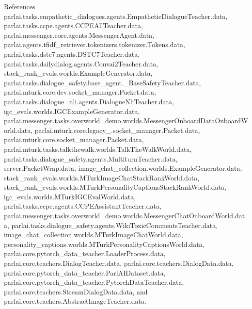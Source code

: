 References parlai.\+tasks.\+empathetic\+\_\+dialogues.\+agents.\+Empathetic\+Dialogue\+Teacher.\+data, parlai.\+tasks.\+ccpe.\+agents.\+C\+C\+P\+E\+All\+Teacher.\+data, parlai.\+messenger.\+core.\+agents.\+Messenger\+Agent.\+data, parlai.\+agents.\+tfidf\+\_\+retriever.\+tokenizers.\+tokenizer.\+Tokens.\+data, parlai.\+tasks.\+dstc7.\+agents.\+D\+S\+T\+C7\+Teacher.\+data, parlai.\+tasks.\+dailydialog.\+agents.\+Convai2\+Teacher.\+data, stack\+\_\+rank\+\_\+evals.\+worlds.\+Example\+Generator.\+data, parlai.\+tasks.\+dialogue\+\_\+safety.\+base\+\_\+agent.\+\_\+\+Base\+Safety\+Teacher.\+data, parlai.\+mturk.\+core.\+dev.\+socket\+\_\+manager.\+Packet.\+data, parlai.\+tasks.\+dialogue\+\_\+nli.\+agents.\+Dialogue\+Nli\+Teacher.\+data, igc\+\_\+evals.\+worlds.\+I\+G\+C\+Example\+Generator.\+data, parlai.\+messenger.\+tasks.\+overworld\+\_\+demo.\+worlds.\+Messenger\+Onboard\+Data\+Onboard\+World.\+data, parlai.\+mturk.\+core.\+legacy\+\_.\+socket\+\_\+manager.\+Packet.\+data, parlai.\+mturk.\+core.\+socket\+\_\+manager.\+Packet.\+data, parlai.\+mturk.\+tasks.\+talkthewalk.\+worlds.\+Talk\+The\+Walk\+World.\+data, parlai.\+tasks.\+dialogue\+\_\+safety.\+agents.\+Multiturn\+Teacher.\+data, server.\+Packet\+Wrap.\+data, image\+\_\+chat\+\_\+collection.\+worlds.\+Example\+Generator.\+data, stack\+\_\+rank\+\_\+evals.\+worlds.\+M\+Turk\+Image\+Chat\+Stack\+Rank\+World.\+data, stack\+\_\+rank\+\_\+evals.\+worlds.\+M\+Turk\+Personality\+Captions\+Stack\+Rank\+World.\+data, igc\+\_\+evals.\+worlds.\+M\+Turk\+I\+G\+C\+Eval\+World.\+data, parlai.\+tasks.\+ccpe.\+agents.\+C\+C\+P\+E\+Assistant\+Teacher.\+data, parlai.\+messenger.\+tasks.\+overworld\+\_\+demo.\+worlds.\+Messenger\+Chat\+Onboard\+World.\+data, parlai.\+tasks.\+dialogue\+\_\+safety.\+agents.\+Wiki\+Toxic\+Comments\+Teacher.\+data, image\+\_\+chat\+\_\+collection.\+worlds.\+M\+Turk\+Image\+Chat\+World.\+data, personality\+\_\+captions.\+worlds.\+M\+Turk\+Personality\+Captions\+World.\+data, parlai.\+core.\+pytorch\+\_\+data\+\_\+teacher.\+Loader\+Process.\+data, parlai.\+core.\+teachers.\+Dialog\+Teacher.\+data, parlai.\+core.\+teachers.\+Dialog\+Data.\+data, parlai.\+core.\+pytorch\+\_\+data\+\_\+teacher.\+Parl\+A\+I\+Dataset.\+data, parlai.\+core.\+pytorch\+\_\+data\+\_\+teacher.\+Pytorch\+Data\+Teacher.\+data, parlai.\+core.\+teachers.\+Stream\+Dialog\+Data.\+data, and parlai.\+core.\+teachers.\+Abstract\+Image\+Teacher.\+data.



